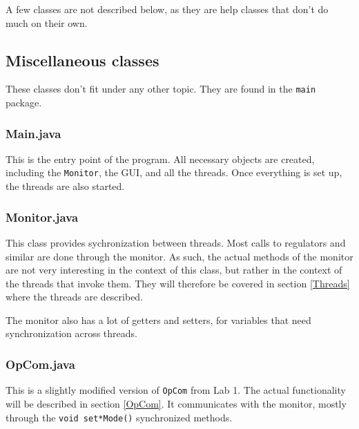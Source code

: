 A few classes are not described below, as they are help classes that don't do much on their own. %






\subsection{Miscellaneous classes} 	%
These classes don't fit under any other topic. They are found in the \texttt{main} package.

\subsubsection{Main.java}
This is the entry point of the program. 
All necessary objects are created, including the \texttt{Monitor}, the GUI, and all the threads.  
Once everything is set up, the threads are also started. 

\subsubsection{Monitor.java}
This class provides sychronization between threads. Most calls to regulators and similar are done through the monitor. 
As such, the actual methods of the monitor are not very interesting in the context of this class, but rather in the context of the threads that invoke them. 
They will therefore be covered in section \ref{Threads} where the threads are described.

The monitor also has a lot of getters and setters, for variables that need synchronization across threads.

\subsubsection{OpCom.java}
This is a slightly modified version of \texttt{OpCom} from Lab 1. 
The actual functionality will be described in section \ref{OpCom}. 
It communicates with the monitor, mostly through the \texttt{void set*Mode()} synchronized methods.




